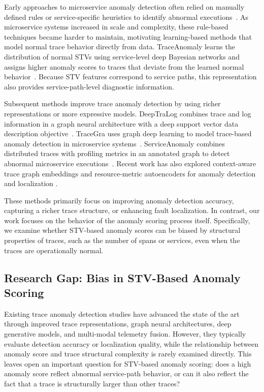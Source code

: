 Early approaches to microservice anomaly detection often relied on
manually defined rules or service-specific heuristics to identify
abnormal executions~\cite{liu2020traceanomaly}. As microservice systems
increased in scale and complexity, these rule-based techniques became
harder to maintain, motivating learning-based methods that model normal
trace behavior directly from data. TraceAnomaly learns the distribution
of normal STVs using service-level deep Bayesian networks and assigns
higher anomaly scores to traces that deviate from the learned normal
behavior~\cite{liu2020traceanomaly}. Because STV features correspond to
service paths, this representation also provides service-path-level
diagnostic information.

Subsequent methods improve trace anomaly detection by using richer
representations or more expressive models. DeepTraLog combines trace and
log information in a graph neural architecture with a deep support vector
data description objective~\cite{zhang2022deeptralog}. TraceGra uses
graph deep learning to model trace-based anomaly detection in
microservice systems~\cite{chen2023tracegra}. ServiceAnomaly combines
distributed traces with profiling metrics in an annotated graph to
detect abnormal microservice executions~\cite{panahandeh2024serviceanomaly}.
Recent work has also explored context-aware trace graph embeddings and
resource-metric autoencoders for anomaly detection and localization
\cite{alomari2025contextaware,xing2025multidim}.

These methods primarily focus on improving anomaly detection accuracy,
capturing a richer trace structure, or enhancing fault localization. In
contrast, our work focuses on the behavior of the anomaly scoring process
itself. Specifically, we examine whether STV-based anomaly scores can be
biased by structural properties of traces, such as the number of spans or
services, even when the traces are operationally normal.

\subsection{Research Gap: Bias in STV-Based Anomaly Scoring}

Existing trace anomaly detection studies have advanced the state of the
art through improved trace representations, graph neural architectures,
deep generative models, and multi-modal telemetry fusion. However, they
typically evaluate detection accuracy or localization quality, while the
relationship between anomaly score and trace structural complexity is
rarely examined directly. This leaves open an important question for
STV-based anomaly scoring: does a high anomaly score reflect abnormal
service-path behavior, or can it also reflect the fact that a trace is
structurally larger than other traces?

